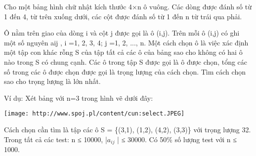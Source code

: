 Cho một bảng hình chữ nhật kích thước 4×n ô vuông. Các dòng được đánh số từ 1 đến 4, từ trên xuống dưới, các cột được đánh số từ 1 đến n từ trái qua phải.

Ô nằm trên giao của dòng i và cột j được gọi là ô (i,j). Trên mỗi ô (i,j) có ghi một số nguyên aij , i =1, 2, 3, 4; j =1, 2, ..., n. Một cách chọn ô là việc xác định một tập con khác rỗng S của tập tất cả các ô của bảng sao cho không có hai ô nào trong S có chung cạnh. Các ô trong tập S được gọi là ô được chọn, tổng các số trong các ô được chọn được gọi là trọng lượng của cách chọn. Tìm cách chọn sao cho trọng lượng là lớn nhất.

Ví dụ: Xét bảng với n=3 trong hình vẽ dưới đây:


\texttt{[image: http://www.spoj.pl/content/cun:select.JPEG]}

Cách chọn cần tìm là tập các ô S = \{(3,1), (1,2), (4,2), (3,3)\} với trọng lượng 32.
Trong tất cả các test: n ≤ 10000, |$a_{ij}$ | ≤ 30000. Có 50\% số lượng test với n ≤ 1000.